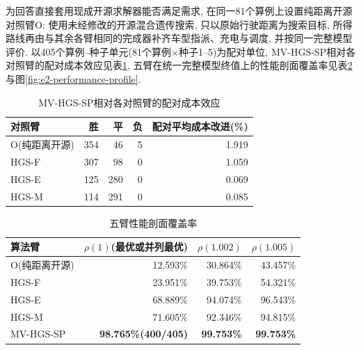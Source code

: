 \documentclass{setp-new}
\newcommand{\setptabsetup}{\fontsize{9pt}{10.5pt}\selectfont\renewcommand{\arraystretch}{0.95}\setlength{\tabcolsep}{2.2pt}\setlength{\aboverulesep}{0.4pt}\setlength{\belowrulesep}{0.4pt}\hbadness=10000}
\begin{document}
为回答直接套用现成开源求解器能否满足需求, 在同一81个算例上设置纯距离开源对照臂O:
使用未经修改的开源混合遗传搜索\cite{ref:64}, 只以原始行驶距离为搜索目标,
所得路线再由与其余各臂相同的完成器补齐车型指派、充电与调度, 并按同一完整模型评价.
以405个算例--种子单元(81个算例$\times$种子1--5)为配对单位,
MV-HGS-SP相对各对照臂的配对成本效应见表\ref{tab:mv-vs-o},
五臂在统一完整模型终值上的性能剖面覆盖率见表\ref{tab:e2-profile}与图\ref{fig:e2-performance-profile}.

\begin{table}[H]
\centering
\caption{MV-HGS-SP相对各对照臂的配对成本效应}
\label{tab:mv-vs-o}
\setptabsetup
\begin{tabular*}{\linewidth}{@{\extracolsep{\fill}}lrrrr@{}}
\toprule
对照臂 & 胜 & 平 & 负 & 配对平均成本改进(\%)\\
\midrule
O(纯距离开源) & 354 & 46 & 5 & 1.919 \\
HGS-F & 307 & 98 & 0 & 1.059 \\
HGS-E & 125 & 280 & 0 & 0.069 \\
HGS-M & 114 & 291 & 0 & 0.085 \\
\bottomrule
\end{tabular*}
\end{table}

\begin{table}[H]
\centering
\caption{五臂性能剖面覆盖率}
\label{tab:e2-profile}
\setptabsetup
\begin{tabular*}{\linewidth}{@{\extracolsep{\fill}}lrrr@{}}
\toprule
算法臂 & $\rho(1)$(最优或并列最优) & $\rho(1.002)$ & $\rho(1.005)$\\
\midrule
O(纯距离开源) & 12.593\% & 30.864\% & 43.457\% \\
HGS-F & 23.951\% & 39.753\% & 54.321\% \\
HGS-E & 68.889\% & 94.074\% & 96.543\% \\
HGS-M & 71.605\% & 92.346\% & 94.815\% \\
MV-HGS-SP & \textbf{98.765\%(400/405)} & \textbf{99.753\%} & \textbf{99.753\%} \\
\bottomrule
\end{tabular*}
\end{table}
\end{document}
